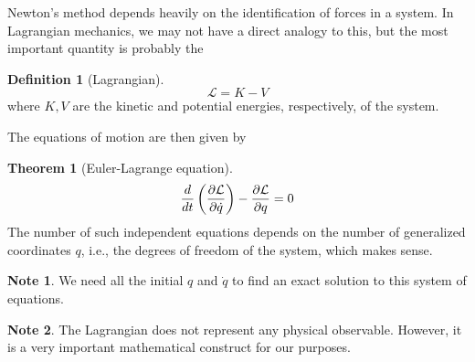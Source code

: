 \documentclass[10pt, a4paper]{extarticle}
\theoremstyle{definition}
\newtheorem{thm}{Theorem}
\newtheorem{defn}{Definition}
\newtheorem*{note*}{Note}
\begin{document}
Newton's method depends heavily on the identification of forces in a system. In Lagrangian mechanics, we may not have a direct analogy to this, but the most important quantity is probably the
\begin{framed}
	\begin{defn}[Lagrangian]
		\[\mathcal{L}=K-V\] where $K,V$ are the kinetic and potential energies, respectively, of the system.
	\end{defn}
\end{framed}
The equations of motion are then given by
\begin{framed}
\begin{thm}[Euler-Lagrange equation]
	\[\frac{d}{dt}\left(\pdv{\mathcal{L}}{\dot{q}}\right)-\pdv{\mathcal{L}}{q}=0\]
	The number of such independent equations depends on the number of generalized coordinates $q$, i.e., the degrees of freedom of the system, which makes sense.
\end{thm}
\begin{note*}
	We need all the initial $q$ and $\dot{q}$ to find an exact solution to this system of equations.
\end{note*}
\begin{note*}
The Lagrangian does not represent any physical observable. However, it is a very important mathematical construct for our purposes.
\end{note*}
\end{framed}
\end{document}
